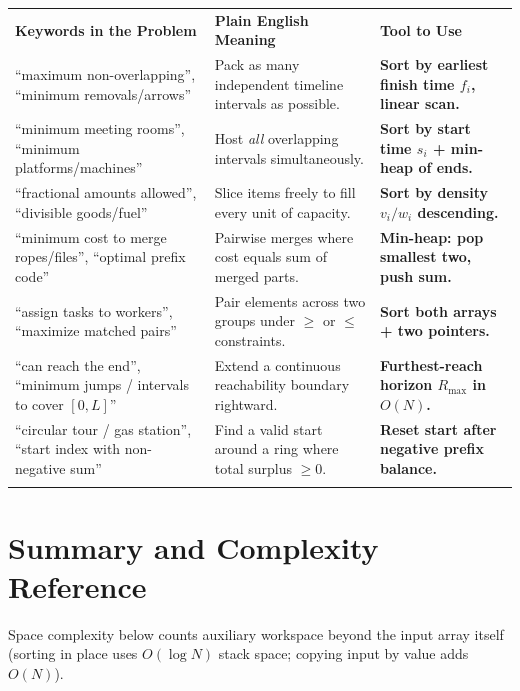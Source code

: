 \documentclass[11pt,a4paper]{article}
\theoremstyle{definition}
\begin{document}
\begingroup\small{}
\begin{tabularx}{\textwidth}{>{\raggedright\arraybackslash}p{4.3cm} >{\raggedright\arraybackslash}X >{\raggedright\arraybackslash\bfseries}p{4.0cm}}
\arrayrulecolor{primaryblue}\toprule[1.2pt]
\rowcolor{primaryblue!10}
\textcolor{primaryblue}{\textbf{Keywords in the Problem}} & \textcolor{primaryblue}{\textbf{Plain English Meaning}} & \textcolor{primaryblue}{\textbf{Tool to Use}} \\
\arrayrulecolor{codeframe}\midrule[0.6pt]
``maximum non-overlapping'', ``minimum removals/arrows'' & Pack as many independent timeline intervals as possible. & Sort by earliest finish time $f_i$, linear scan. \\
``minimum meeting rooms'', ``minimum platforms/machines'' & Host \emph{all} overlapping intervals simultaneously. & Sort by start time $s_i$ + min-heap of ends. \\
``fractional amounts allowed'', ``divisible goods/fuel'' & Slice items freely to fill every unit of capacity. & Sort by density $v_i / w_i$ descending. \\
``minimum cost to merge ropes/files'', ``optimal prefix code'' & Pairwise merges where cost equals sum of merged parts. & Min-heap: pop smallest two, push sum. \\
``assign tasks to workers'', ``maximize matched pairs'' & Pair elements across two groups under $\ge$ or $\le$ constraints. & Sort both arrays + two pointers. \\
``can reach the end'', ``minimum jumps / intervals to cover $[0, L]$'' & Extend a continuous reachability boundary rightward. & Furthest-reach horizon $R_{\max}$ in $O(N)$. \\
``circular tour / gas station'', ``start index with non-negative sum'' & Find a valid start around a ring where total surplus $\ge 0$. & Reset start after negative prefix balance. \\
\arrayrulecolor{primaryblue}\bottomrule[1.2pt]
\end{tabularx}\endgroup

\section{Summary and Complexity Reference}

Space complexity below counts auxiliary workspace beyond the input array itself (sorting in place uses $O(\log N)$ stack space; copying input by value adds $O(N)$).
\end{document}
